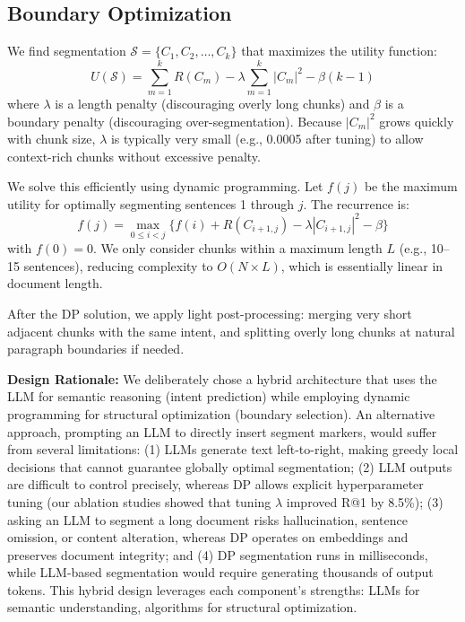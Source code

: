 \documentclass[conference]{IEEEtran}
\begin{document}
\subsection{Boundary Optimization}

We find segmentation $\mathcal{S} = \{C_1, C_2, \ldots, C_k\}$ that maximizes the utility function:
\begin{equation}
U(\mathcal{S}) = \sum_{m=1}^k R(C_m) - \lambda \sum_{m=1}^k |C_m|^2 - \beta(k-1)
\end{equation}
where $\lambda$ is a length penalty (discouraging overly long chunks) and $\beta$ is a boundary penalty (discouraging over-segmentation). Because $|C_m|^2$ grows quickly with chunk size, $\lambda$ is typically very small (e.g., 0.0005 after tuning) to allow context-rich chunks without excessive penalty.

We solve this efficiently using dynamic programming. Let $f(j)$ be the maximum utility for optimally segmenting sentences 1 through $j$. The recurrence is:
\begin{equation}
f(j) = \max_{0 \le i < j} \{ f(i) + R(C_{i+1,j}) - \lambda |C_{i+1,j}|^2 - \beta \}
\end{equation}
with $f(0) = 0$. We only consider chunks within a maximum length $L$ (e.g., 10--15 sentences), reducing complexity to $O(N \times L)$, which is essentially linear in document length.

After the DP solution, we apply light post-processing: merging very short adjacent chunks with the same intent, and splitting overly long chunks at natural paragraph boundaries if needed.

\textbf{Design Rationale:} We deliberately chose a hybrid architecture that uses the LLM for semantic reasoning (intent prediction) while employing dynamic programming for structural optimization (boundary selection). An alternative approach, prompting an LLM to directly insert segment markers, would suffer from several limitations: (1) LLMs generate text left-to-right, making greedy local decisions that cannot guarantee globally optimal segmentation; (2) LLM outputs are difficult to control precisely, whereas DP allows explicit hyperparameter tuning (our ablation studies showed that tuning $\lambda$ improved R@1 by 8.5\%); (3) asking an LLM to segment a long document risks hallucination, sentence omission, or content alteration, whereas DP operates on embeddings and preserves document integrity; and (4) DP segmentation runs in milliseconds, while LLM-based segmentation would require generating thousands of output tokens. This hybrid design leverages each component's strengths: LLMs for semantic understanding, algorithms for structural optimization.
\end{document}

